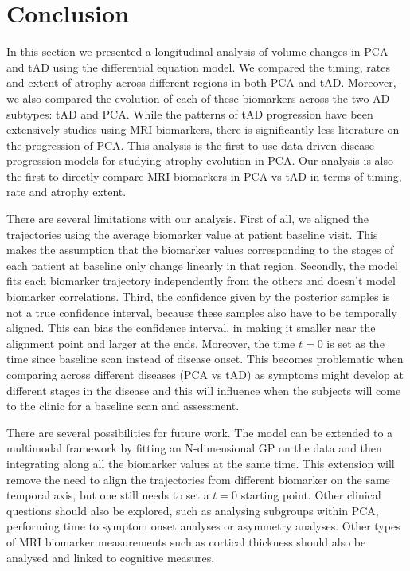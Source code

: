 \section{Conclusion}
\label{sec:demConclusion}

In this section we presented a longitudinal analysis of volume changes in PCA and tAD using the differential equation model. We compared the timing, rates and extent of atrophy across different regions in both PCA and tAD. Moreover, we also compared the evolution of each of these biomarkers across the two AD subtypes: tAD and PCA. While the patterns of tAD progression have been extensively studies using MRI biomarkers, there is significantly less literature on the progression of PCA. This analysis is the first to use data-driven disease progression models for studying atrophy evolution in PCA. Our analysis is also the first to directly compare MRI biomarkers in PCA vs tAD in terms of timing, rate and atrophy extent. 

There are several limitations with our analysis. First of all, we aligned the trajectories using the average biomarker value at patient baseline visit. This makes the assumption that the biomarker values corresponding to the stages of each patient at baseline only change linearly in that region. Secondly, the model fits each biomarker trajectory independently from the others and doesn't model biomarker correlations. Third, the confidence given by the posterior samples is not a true confidence interval, because these samples also have to be temporally aligned. This can bias the confidence interval, in making it smaller near the alignment point and larger at the ends. Moreover, the time $t=0$ is set as the time since baseline scan instead of disease onset. This becomes problematic when comparing across different diseases (PCA vs tAD) as symptoms might develop at different stages in the disease and this will influence when the subjects will come to the clinic for a baseline scan and assessment. 

There are several possibilities for future work. The model can be extended to a multimodal framework by fitting an N-dimensional GP on the data and then integrating along all the biomarker values at the same time. This extension will remove the need to align the trajectories from different biomarker on the same temporal axis, but one still needs to set a $t=0$ starting point. Other clinical questions should also be explored, such as analysing subgroups within PCA, performing time to symptom onset analyses or asymmetry analyses. Other types of MRI biomarker measurements such as cortical thickness should also be analysed and linked to cognitive measures. 
